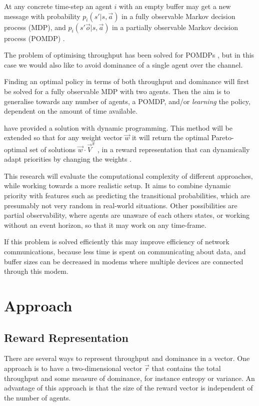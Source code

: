 \documentclass{article}
\begin{document}
\begin{multicols}{2}
	At any concrete time-step an agent $i$ with an empty buffer may get a new
	message with probability $p_i(s' |s, \vec{a})$ in a fully observable Markov
	decision process (MDP), and $p_i(s' \vec{o}|s, \vec{a})$ in a partially
	observable Markov decision process (POMDP) \citep{hansen2004dynamic}.

	The problem of optimising throughput has been solved for POMDPs
	\citep{ooi1996decentralized, hansen2004dynamic}, but in this case we would
	also like to avoid dominance of a single agent over the channel.

	Finding an optimal policy in terms of both throughput and dominance will
	first be solved for a fully observable MDP with two agents. Then the aim is
	to generalise towards any number of agents, a POMDP, and/or \emph{learning}
	the policy, dependent on the amount of time available.

	\citet{hansen2004dynamic} have provided a solution with dynamic programming.
	This method will be extended so that for any weight vector $\vec{w}$ it will
	return the optimal Pareto-optimal set of solutions $\vec{w} \cdot
	\vec{V}^\pi$ \citep{vamplew2011empirical}, in a reward representation that
	can dynamically adapt priorities by changing the weights
	\citep{barrett2008learning,natarajan2005dynamic}.

	This research will evaluate the computational complexity of different
	approaches, while working towards a more realistic setup. It aims to
	combine dynamic priority with features such as predicting the transitional
	probabilities, which are presumably not very random in real-world
	situations. Other possibilities are partial observability, where agents are
	unaware of each others states, or working without an event horizon, so that
	it may work on any time-frame.

	If this problem is solved efficiently this may improve efficiency of network
	communications, because less time is spent on communicating about data, and
	buffer sizes can be decreased in modems where multiple devices are connected
	through this modem.

	\section{Approach}
	\label{sec:approach}

		\subsection{Reward Representation}
		\label{sub:reward_representation}
		There are several ways to represent throughput and dominance in a vector.
		One approach is to have a two-dimensional vector $\vec{r}$ that contains
		the total throughput and some measure of dominance, for instance entropy
		or variance. An advantage of this approach is that the size of the reward
		vector is independent of the number of agents.


\end{multicols}
\end{document}
